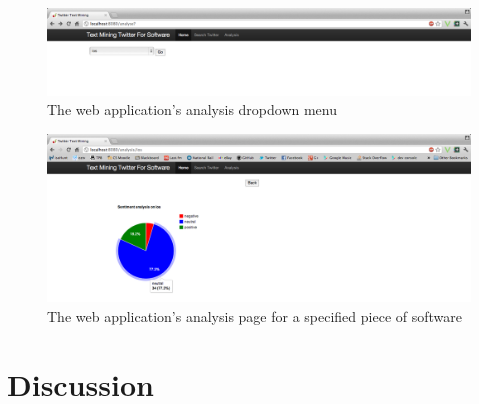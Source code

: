 \begin{figure}[h]
\begin{center}
\includegraphics[width=15cm]{gui4}
\end{center}
\caption{The web application's analysis dropdown menu}
\label{fig:gui4}
\end{figure}

\begin{figure}[h]
\begin{center}
\includegraphics[width=15cm]{gui5}
\end{center}
\caption{The web application's analysis page for a specified piece of software}
\label{fig:gui5}
\end{figure}

\section{Discussion}
